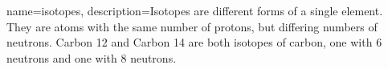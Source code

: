 {
    name=isotopes,
    description={Isotopes are different forms of a single element. They are atoms with the same number of protons, but differing numbers of neutrons. Carbon 12 and Carbon 14 are both isotopes of carbon, one with 6 neutrons and one with 8 neutrons.}
}
